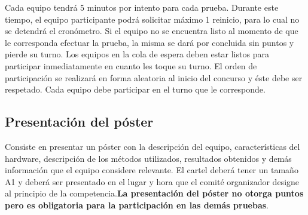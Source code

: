 \documentclass[letterpaper,12pt]{article}
\begin{document}
Cada equipo tendrá 5 minutos por intento para cada prueba. Durante este tiempo, el equipo participante podrá solicitar máximo 1 reinicio, para lo cual no se detendrá el cronómetro. Si el equipo no se encuentra listo al momento de que le corresponda efectuar la prueba, la misma se dará por concluida sin puntos y pierde su turno. Los equipos en la cola de espera deben estar listos para participar inmediatamente en cuanto les toque su turno. El orden de participación se realizará en forma aleatoria al inicio del concurso y éste debe ser respetado. Cada equipo debe participar en el turno que le corresponde.

\subsection{Presentación del póster}
Consiste en presentar un póster con la descripción del equipo, características del hardware, descripción de los métodos utilizados, resultados obtenidos y demás información que el equipo considere relevante. El cartel deberá tener un tamaño A1 y deberá ser presentado en el lugar y hora que el comité organizador designe al principio de la competencia.\textbf{La presentación del póster no otorga puntos pero es obligatoria para la participación en las demás pruebas}.

\end{document}
